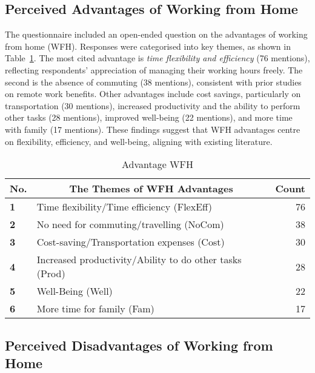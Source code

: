 \documentclass[conference]{IEEEtran}
\begin{document}
\subsection{Perceived Advantages of Working from Home}
\label{sec:advantage-wfh}

The questionnaire included an open-ended question on the advantages of working from home (WFH). Responses were categorised into key themes, as shown in Table~\ref{Advantage of WFH}. The most cited advantage is \textit{time flexibility and efficiency} (76 mentions), reflecting respondents' appreciation of managing their working hours freely. The second is the absence of commuting (38 mentions), consistent with prior studies on remote work benefits. Other advantages include cost savings, particularly on transportation (30 mentions), increased productivity and the ability to perform other tasks (28 mentions), improved well-being (22 mentions), and more time with family (17 mentions). These findings suggest that WFH advantages centre on flexibility, efficiency, and well-being, aligning with existing literature.


\begin{table}[ht]
	\caption{Advantage WFH}
	\label{Advantage of WFH}
	\begin{tabular}{|p{}|p{}|r|}
		\hline
		\multicolumn{1}{|c|}{\textbf{No.}} & \multicolumn{1}{c|}{\textbf{The Themes of WFH Advantages}} & \textbf{Count} \\ \hline
		\textbf{1}                 & Time flexibility/Time efficiency (FlexEff)         &76 %
		\\ \hline
		\textbf{2}                 & No need for commuting/travelling (NoCom)        & 38 %
		\\ \hline
		\textbf{3}                 & Cost-saving/Transportation expenses (Cost)        & 30 %
		\\ \hline
		\textbf{4}                 & Increased productivity/Ability to do other tasks (Prod)& 28 %
		\\ \hline
		\textbf{5}                 & Well-Being (Well)        & 22     
		\\ \hline
		\textbf{6}                 & More time for family (Fam)              & 17 %
		\\ \hline
	\end{tabular}
\end{table}

\subsection{Perceived Disadvantages of Working from Home}
\label{sec:disadvantage-wfh}
\end{document}

